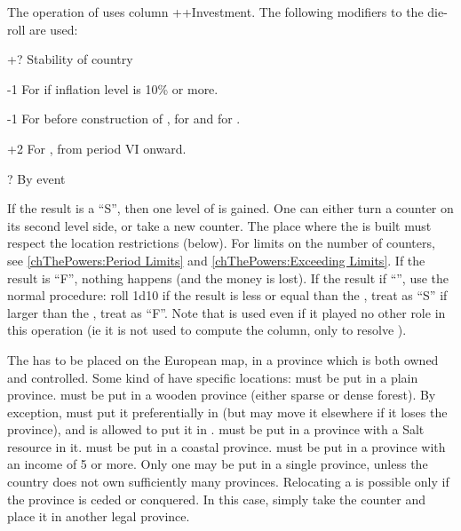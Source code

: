 \aparag The operation of  uses column
\ADM++Investment.
\bparag The following modifiers to the die-roll are used:
\begin{modlist}
\item[+?]Stability of country
\item[-1]For \SPA if inflation level is 10\% or more.
\item[-1]For \RUS before construction of , for \TUR
  and for \POL.
\item[+2]For \ENG, from period VI onward.
\item[\textplusminus?]By event
\end{modlist}
\bparag If the result is a ``S'', then one level of \MNU is gained. One can
either turn a counter on its second level side, or take a new \MNU counter.
\bparag The place where the \MNU is built must respect the location
restrictions (below).
\bparag For limits on the number of counters, see \ref{chThePowers:Period
  Limits} and \ref{chThePowers:Exceeding Limits}.
\bparag If the result is ``F'', nothing happens (and the money is lost).
\bparag If the result if ``\undemi'', use the normal procedure: roll 1d10 if
the result is less or equal than the \FTI, treat as ``S'' if larger than the
\FTI, treat as ``F''. Note that \FTI is used even if it played no other role
in this operation (ie it is not used to compute the column, only to resolve
\undemi).

\label{chExpenses:Manufacture Placement} The \MNU
has to be placed on the European map, in a province which is both owned and
controlled. Some kind of \MNU have specific locations:
\bparag {} \MNU must be put in a plain province.
\bparag {} \MNU must be put in a wooden province (either sparse or
dense forest). By exception, \ENG must put it preferentially in
 (but may move it elsewhere if it loses the province), and
\TUR is allowed to put it in .
\bparag {} \MNU must be put in a province with a Salt resource in it.
\bparag {} \MNU must be put in a coastal province.
\bparag {} \MNU must be put in a province with an income of 5 or more.
\bparag Only one \MNU may be put in a single province, unless the country does
not own sufficiently many provinces.
\bparag Relocating a \MNU is possible only if the province is ceded or
conquered. In this case, simply take the counter and place it in another legal
province.

